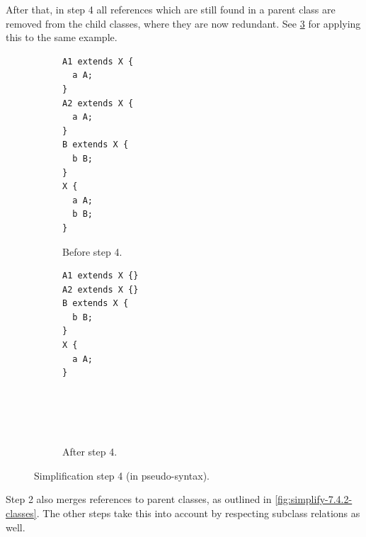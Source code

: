 After that, in step 4 all references which are still found in a parent class
are removed from the child classes, where they are now redundant.
See \cref{fig:simplify-7.4.4} for applying this to the same example.

\begin{figure}[ht]
  \begin{subfigure}[t]{0.45\textwidth}
    \begin{lstlisting}
A1 extends X {
  a A;
}
A2 extends X {
  a A;
}
B extends X {
  b B;
}
X {
  a A;
  b B;
}
    \end{lstlisting}
    \caption{Before step 4.}
    \label{fig:simplify-7.4.4-before}
  \end{subfigure}
  \begin{subfigure}[t]{0.45\textwidth}
    \begin{lstlisting}[showlines=true]
A1 extends X {}
A2 extends X {}
B extends X {
  b B;
}
X {
  a A;
}





    \end{lstlisting}
    \caption{After step 4.}
    \label{fig:simplify-7.4.4-after}
  \end{subfigure}
  \caption[Simplification step 4.]{Simplification step 4 (in pseudo-syntax).}
  \label{fig:simplify-7.4.4}
\end{figure}

Step 2 also merges references to parent classes,
as outlined in \cref{fig:simplify-7.4.2-classes}.
The other steps take this into account by respecting subclass relations as well.

